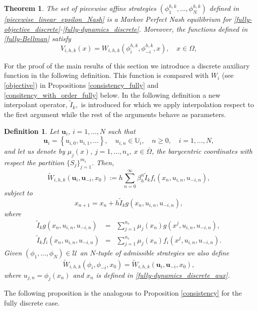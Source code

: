 \documentclass[12pt]{article}
\newcommand{\bs}{\boldsymbol}
\newcommand{\bu}{\bs{u}}
\newtheorem{theorem}{Theorem}
\newtheorem{definition}{Definition}
\begin{document}
\begin{theorem}\label{verification_fully-time_discrete}
The set of piecewise affine strategies $(\phi_1^{h,k},\ldots,\phi_N^{h,k})$ defined in \eqref{piecewise_linear_epsilon_Nash} is a Markov Perfect Nash equilibrium for \eqref{fully-objective_discrete}-\eqref{fully-dynamics_discrete}. Moreover, the functions defined in \eqref{fully-Bellman} satisfy
$$V_{i,h,k}(x)=W_{i,h,k}(\phi_i^{h,k},\phi_{-i}^{h,k},x),\quad x\in\Omega,$$
\end{theorem}
For the proof of the main results of this section we introduce a discrete auxiliary  function in the following definition. This
function is compared with $W_i$  (see \eqref{objective}) in Propositions \ref{consistency_fully} and \ref{consitency_with_order_fully} below.
{In the following definition a new interpolant operator, $\tilde I_k,$ is introduced for which we apply interpolation respect to the first argument while the rest of the arguments behave as parameters.}
\begin{definition} Let $\bs{u}_i$, $i=1,\dots, N$ such that
$$
\bs{u}_i=\left\{u_{i,0},u_{i,1},\ldots\right\},\quad u_{i,n}\in\mathbb{U}_i,\quad n\ge 0,\quad i=1,\dots, N,
$$
and let us denote by $\mu_j(x)$, $j=1,\dots, n_s$, $x\in \overline\Omega$, the barycentric coordinates with respect the partition $\{S_j\}_{j=1}^{m_s}$.
Then,
\begin{equation}
\widetilde W_{i,h,k}(\bu_i,\bu_{-i},x_0):=h\sum_{n=0}^\infty \beta_h^n \tilde{I}_kf_i(x_n,u_{i,n},u_{-i,n}), \label{fully-objective_discrete_aux}
\end{equation}
subject to
\begin{equation}\label{fully-dynamics_discrete_aux}
x_{n+1}=x_n+h\tilde{I}_kg(x_n,u_{i,n},u_{-i,n}),
\end{equation}
where
\begin{eqnarray*}\label{defino1}
\tilde{I}_kg(x_n,u_{i,n},u_{-i,n})&=&\sum_{j=1}^{n_s}\mu_j(x_n)g(x^j,u_{i,n},u_{-i,n}),\\
\tilde{I}_kf_i(x_n,u_{i,n},u_{-i,n})&=&\sum_{j=1}^{n_s}\mu_j(x_n)f_i(x^j,u_{i,n},u_{-i,n}).\label{defino2}
\end{eqnarray*}
Given $(\phi_1,\dots,\phi_N)\in\mathcal{U}$ an $N$-tuple of admissible strategies we also define
$$
\widetilde W_{i,h,k}(\phi_{i},\phi_{-i},{x_0})=\widetilde W_{i,h,k}(\bu_i,\bu_{-i},x_0),
$$
where $u_{j,n}=\phi_j(x_n)$ and $x_n$ is defined in \eqref{fully-dynamics_discrete_aux}.
\end{definition}
The following proposition is the analogous to Proposition \ref{consistency} for the fully discrete case.
\end{document}

